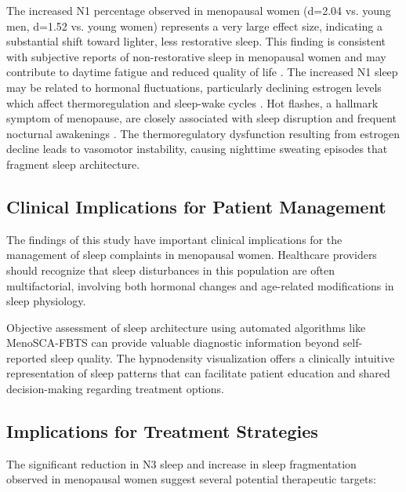 \documentclass[a4paper,fleqn]{cas-dc}
\begin{document}
The increased N1 percentage observed in menopausal women (d=2.04 vs. young men, d=1.52 vs. young women) represents a very large effect size, indicating a substantial shift toward lighter, less restorative sleep. This finding is consistent with subjective reports of non-restorative sleep in menopausal women and may contribute to daytime fatigue and reduced quality of life \cite{Baker2023}. The increased N1 sleep may be related to hormonal fluctuations, particularly declining estrogen levels which affect thermoregulation and sleep-wake cycles \cite{Kronenberg1990}. Hot flashes, a hallmark symptom of menopause, are closely associated with sleep disruption and frequent nocturnal awakenings \cite{Freedman2004}. The thermoregulatory dysfunction resulting from estrogen decline leads to vasomotor instability, causing nighttime sweating episodes that fragment sleep architecture.

\subsection{Clinical Implications for Patient Management}

The findings of this study have important clinical implications for the management of sleep complaints in menopausal women. Healthcare providers should recognize that sleep disturbances in this population are often multifactorial, involving both hormonal changes and age-related modifications in sleep physiology.

Objective assessment of sleep architecture using automated algorithms like MenoSCA-FBTS can provide valuable diagnostic information beyond self-reported sleep quality. The hypnodensity visualization offers a clinically intuitive representation of sleep patterns that can facilitate patient education and shared decision-making regarding treatment options.

\subsection{Implications for Treatment Strategies}

The significant reduction in N3 sleep and increase in sleep fragmentation observed in menopausal women suggest several potential therapeutic targets:
\end{document}
